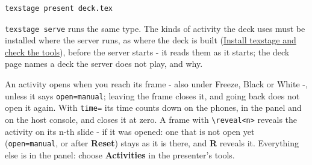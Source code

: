 \documentclass[a4paper,11pt]{article}
\begin{document}
\par\noindent\begin{minipage}{\linewidth}
\begin{Verbatim}
texstage present deck.tex
\end{Verbatim}
\end{minipage}\par\smallskip

\texttt{texstage serve} runs the same type.\allowbreak{} The kinds of activity the deck uses must be installed where the server runs, as where the deck is built (\hyperref[sec:install-texstage-and-check-the-tools]{Install texstage and check the tools}), before the server starts -\allowbreak{} it reads them as it starts; the deck page names a deck the server does not play, and why.\par

An activity opens when you reach its frame -\allowbreak{} also under Freeze, Black or White -\allowbreak{}, unless it says \texttt{open=\allowbreak{}manual}; leaving the frame closes it, and going back does not open it again.\allowbreak{} With \texttt{time=} its time counts down on the phones, in the panel and on the host console, and closes it at zero.\allowbreak{} A frame with \texttt{\textbackslash{}\allowbreak{}reveal<n>} reveals the activity on its n-\allowbreak{}th slide -\allowbreak{} if it was opened: one that is not open yet (\texttt{open=\allowbreak{}manual}, or after \textbf{Reset}) stays as it is there, and \textbf{R} reveals it.\allowbreak{} Everything else is in the panel: choose \textbf{Activities} in the presenter's tools.\par
\end{document}
